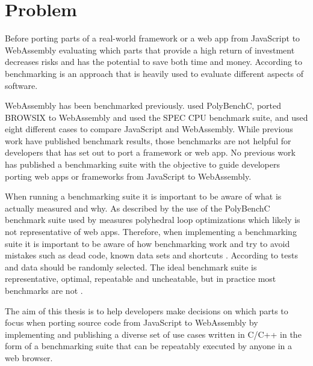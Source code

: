 \section{Problem}
\label{problem}

Before porting parts of a real-world framework or a web app from JavaScript to WebAssembly evaluating which parts that provide a high return of investment decreases risks \parencite{Boehm1991} and has the potential to save both time and money. According to \textcite{CaiNerurkarWu1998} benchmarking is an approach that is heavily used to evaluate different aspects of software. 

WebAssembly has been benchmarked previously. \textcite{HaasRossbergSchuffTitzerHolmanGohmanWagnerZakaiBastien2017} used PolyBenchC, \textcite{JangdaPowersGuhaBerger2019} ported BROWSIX \parencite{PowersVilkBerger2017} to WebAssembly and used the SPEC CPU benchmark suite, and \textcite{ReiserBlaser2017} used eight different cases \parencite[Table 1 in][]{ReiserBlaser2017} to compare JavaScript and WebAssembly. While previous work have published benchmark results, those benchmarks are not helpful for developers that has set out to port a framework or web app. No previous work has published a benchmarking suite with the objective to guide developers porting web apps or frameworks from JavaScript to WebAssembly.

When running a benchmarking suite it is important to be aware of what is actually measured and why. As described by \textcite{JangdaPowersGuhaBerger2019} the use of the PolyBenchC benchmark suite used by \textcite{HaasRossbergSchuffTitzerHolmanGohmanWagnerZakaiBastien2017} measures polyhedral loop optimizations which likely is not representative of web apps. Therefore, when implementing a benchmarking suite it is important to be aware of how benchmarking work and try to avoid mistakes such as dead code, known data sets and shortcuts \parencite{CaiNerurkarWu1998}. According to \textcite{CaiNerurkarWu1998} tests and data should be randomly selected. The ideal benchmark suite is representative, optimal, repeatable and uncheatable, but in practice most benchmarks are not \parencite{CaiNerurkarWu1998}.

The aim of this thesis is to help developers make decisions on which parts to focus when porting source code from JavaScript to WebAssembly by implementing and publishing a diverse set of use cases written in C/C++ in the form of a benchmarking suite that can be repeatably executed by anyone in a web browser.

